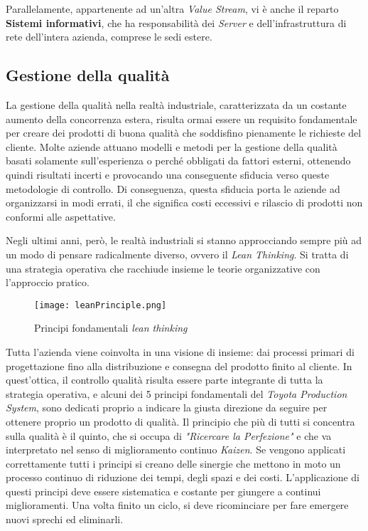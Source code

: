 Parallelamente, appartenente ad un'altra \textit{Value Stream}, vi è anche il reparto \textbf{Sistemi informativi}, che ha responsabilità dei \textit{Server} e dell'infrastruttura di rete dell'intera azienda, comprese le sedi estere.



\subsection{Gestione della qualità}
La gestione della qualità nella realtà industriale, caratterizzata da un costante aumento della concorrenza estera, risulta ormai essere un requisito fondamentale per creare dei prodotti di buona qualità che soddisfino pienamente le richieste del cliente. 
Molte aziende attuano modelli e metodi per la gestione della qualità basati solamente sull'esperienza o perché obbligati da fattori esterni, ottenendo quindi risultati incerti e provocando una conseguente sfiducia verso queste metodologie di controllo. Di conseguenza, questa sfiducia porta le aziende ad organizzarsi in modi errati, il che significa costi eccessivi e rilascio di prodotti non conformi alle aspettative. 

Negli ultimi anni, però, le realtà industriali si stanno approcciando sempre più ad un modo di pensare radicalmente diverso, ovvero il \textit{Lean Thinking}. Si tratta di una strategia operativa che racchiude insieme le teorie organizzative con l'approccio pratico. 

\begin{figure}[H]
  \centering
  \texttt{[image: leanPrinciple.png]}
  \caption{Principi fondamentali \textit{lean thinking}}
\end{figure}

Tutta l'azienda viene coinvolta in una visione di insieme: dai processi primari di progettazione fino alla distribuzione e consegna del prodotto finito al cliente. In quest'ottica, il controllo qualità risulta essere parte integrante di tutta la strategia operativa, e alcuni dei 5 principi fondamentali del \textit{Toyota Production System}, sono dedicati proprio a indicare la giusta direzione da seguire per ottenere proprio un prodotto di qualità. Il principio che più di tutti si concentra sulla qualità è il quinto, che si occupa di \textit{"Ricercare la Perfezione"} e che va interpretato nel senso di miglioramento continuo \textit{Kaizen}. Se vengono applicati correttamente tutti i principi si creano delle sinergie che mettono in moto un processo continuo di riduzione dei tempi, degli spazi e dei costi. L'applicazione di questi principi deve essere sistematica e costante per giungere a continui miglioramenti. Una volta finito un ciclo, si deve ricominciare per fare emergere nuovi sprechi ed eliminarli. 

